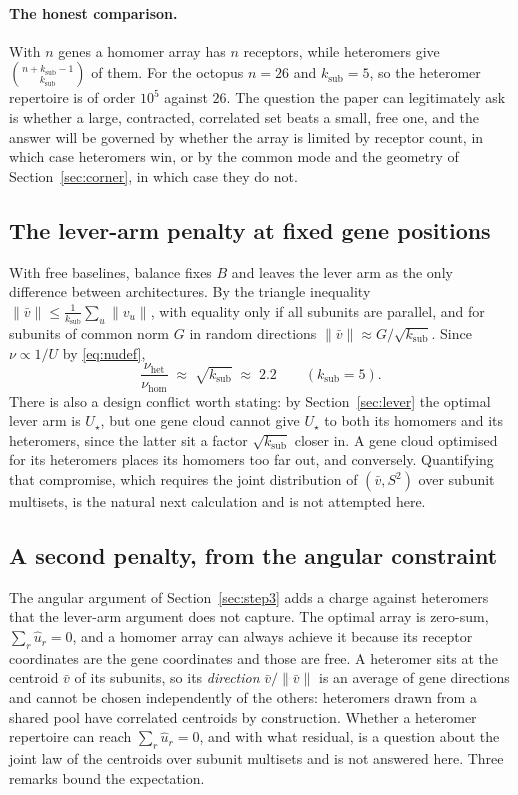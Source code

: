 \documentclass[11pt,a4paper]{article}
\newcommand{\ksub}{k_{\mathrm{sub}}}
\newcommand{\uhat}{\hat{u}}
\begin{document}
\paragraph{The honest comparison.} With $n$ genes a homomer array has $n$ receptors,
while heteromers give $\binom{n+\ksub-1}{\ksub}$ of them. For the octopus $n=26$ and
$\ksub=5$, so the heteromer repertoire is of order $10^5$ against $26$. The question the
paper can legitimately ask is whether a large, contracted, correlated set beats a small,
free one, and the answer will be governed by whether the array is limited by receptor
count, in which case heteromers win, or by the common mode and the geometry of
Section~\ref{sec:corner}, in which case they do not.

\subsection{The lever-arm penalty at fixed gene positions}

With free baselines, balance fixes $B$ and leaves the lever arm as the only difference
between architectures. By the triangle inequality $\|\bar v\|\le\frac{1}{\ksub}\sum_u\|v_u\|$,
with equality only if all subunits are parallel, and for subunits of common norm $G$ in
random directions $\|\bar v\|\approx G/\sqrt{\ksub}$. Since
$\nu\propto1/U$ by \eqref{eq:nudef},
\begin{equation}
  \frac{\nu_{\mathrm{het}}}{\nu_{\mathrm{hom}}}\;\approx\;\sqrt{\ksub}\;\approx\;2.2
  \qquad(\ksub=5).
\end{equation}
There is also a design conflict worth stating: by Section~\ref{sec:lever} the optimal
lever arm is $U_\star$, but one gene cloud cannot give $U_\star$ to both its homomers and
its heteromers, since the latter sit a factor $\sqrt{\ksub}$ closer in. A gene cloud
optimised for its heteromers places its homomers too far out, and conversely. Quantifying
that compromise, which requires the joint distribution of $(\bar v,S^2)$ over subunit
multisets, is the natural next calculation and is not attempted here.

\subsection{A second penalty, from the angular constraint}
\label{app:hetero_dirs}

The angular argument of Section~\ref{sec:step3} adds a charge against heteromers that the lever-arm
argument does not capture. The optimal array is zero-sum, $\sum_r\uhat_r=0$, and a homomer
array can always achieve it because its receptor coordinates are the gene coordinates and
those are free. A heteromer sits at the centroid $\bar v$ of its subunits, so its
\emph{direction} $\bar v/\|\bar v\|$ is an average of gene directions and cannot be chosen
independently of the others: heteromers drawn from a shared pool have correlated centroids
by construction. Whether a heteromer repertoire can reach $\sum_r\uhat_r=0$, and with what
residual, is a question about the joint law of the centroids over subunit multisets and is
not answered here. Three remarks bound the expectation.
\end{document}
